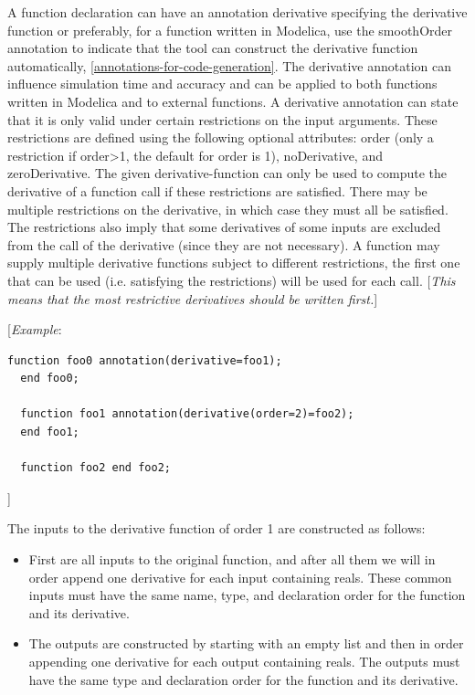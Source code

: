 \documentclass[10pt,a4paper]{report}
\begin{document}
A function declaration can have an annotation derivative specifying the
derivative function or preferably, for a function written in Modelica,
use the smoothOrder annotation to indicate that the tool can construct
the derivative function automatically, \ref{annotations-for-code-generation}. The derivative
annotation can influence simulation time and accuracy and can be applied
to both functions written in Modelica and to external functions. A
derivative annotation can state that it is only valid under certain
restrictions on the input arguments. These restrictions are defined
using the following optional attributes: order (only a restriction if
order\textgreater{}1, the default for order is 1), noDerivative, and
zeroDerivative. The given derivative-function can only be used to
compute the derivative of a function call if these restrictions are
satisfied. There may be multiple restrictions on the derivative, in
which case they must all be satisfied. The restrictions also imply that
some derivatives of some inputs are excluded from the call of the
derivative (since they are not necessary). A function may supply
multiple derivative functions subject to different restrictions, the
first one that can be used (i.e. satisfying the restrictions) will be
used for each call. {[}\emph{This means that the most restrictive
derivatives should be written first.}{]}

{[}\emph{Example}:

\begin{lstlisting}[language=modelica]
  function foo0 annotation(derivative=foo1);
  end foo0;

  function foo1 annotation(derivative(order=2)=foo2);
  end foo1;

  function foo2 end foo2;
\end{lstlisting}
{]}

The inputs to the derivative function of order 1 are constructed as
follows:

\begin{itemize}
\item
  First are all inputs to the original function, and after all them we
  will in order append one derivative for each input containing reals.
  These common inputs must have the same name, type, and declaration
  order for the function and its derivative.
\item
  The outputs are constructed by starting with an empty list and then in
  order appending one derivative for each output containing reals. The
  outputs must have the same type and declaration order for the function
  and its derivative.
\end{itemize}
\end{document}
